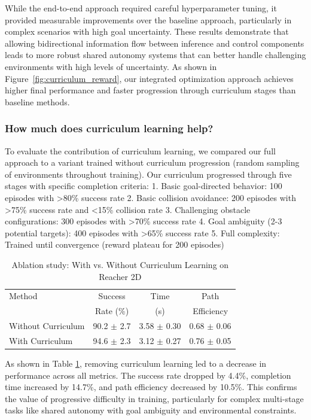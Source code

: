 \documentclass[11pt]{article}
\begin{document}
While the end-to-end approach required careful hyperparameter tuning, it provided measurable improvements over the baseline approach, particularly in complex scenarios with high goal uncertainty. These results demonstrate that allowing bidirectional information flow between inference and control components leads to more robust shared autonomy systems that can better handle challenging environments with high levels of uncertainty. As shown in Figure~\ref{fig:curriculum_reward}, our integrated optimization approach achieves higher final performance and faster progression through curriculum stages than baseline methods.

\subsubsection{\textbf{How much does curriculum learning help?}}
To evaluate the contribution of curriculum learning, we compared our full approach to a variant trained without curriculum progression (random sampling of environments throughout training).
Our curriculum progressed through five stages with specific completion criteria:
1. Basic goal-directed behavior: 100 episodes with >80\% success rate
2. Basic collision avoidance: 200 episodes with >75\% success rate and <15\% collision rate
3. Challenging obstacle configurations: 300 episodes with >70\% success rate
4. Goal ambiguity (2-3 potential targets): 400 episodes with >65\% success rate
5. Full complexity: Trained until convergence (reward plateau for 200 episodes)



\begin{table}[h]
\caption{Ablation study: With vs. Without Curriculum Learning on Reacher 2D}
\label{tab:curriculum}
\centering
\begin{tabular}{lccc}
\toprule
Method & Success & Time & Path \\
 & Rate (\%) & (s) & Efficiency \\
\midrule
Without Curriculum & 90.2 $\pm$ 2.7 & 3.58 $\pm$ 0.30 & 0.68 $\pm$ 0.06 \\
With Curriculum & 94.6 $\pm$ 2.3 & 3.12 $\pm$ 0.27 & 0.76 $\pm$ 0.05 \\
\bottomrule
\end{tabular}
\end{table}

As shown in Table \ref{tab:curriculum}, removing curriculum learning led to a decrease in performance across all metrics. The success rate dropped by 4.4\%, completion time increased by 14.7\%, and path efficiency decreased by 10.5\%. This confirms the value of progressive difficulty in training, particularly for complex multi-stage tasks like shared autonomy with goal ambiguity and environmental constraints.
\end{document}
